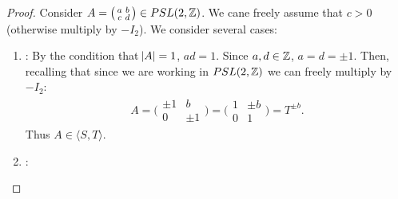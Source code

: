 \begin{proof}
Consider $A = \big(\begin{smallmatrix}
  a & b\\
  c & d
\end{smallmatrix}\big) \in PSL(2,\mathbb{Z})$. We cane freely assume that $c > 0$ (otherwise multiply by $- I_2$). We consider several cases:

\begin{enumerate}
    \item {}:
    By the condition that $\abs{A} = 1$, $ad = 1$. Since $a,d \in \mathbb{Z}$, $a = d = \pm 1$. Then, recalling that since we are working in $PSL(2,\mathbb{Z})$ we can freely multiply by $-I_2$:
    \begin{align*}
        A =  \bigg( \begin{matrix}
  \pm 1 & b\\
  0 & \pm 1
\end{matrix} \bigg) = \bigg( \begin{matrix}
  1 & \pm b\\
  0 & 1
\end{matrix} \bigg) = T^{\pm b}.
    \end{align*}
    Thus $A \in \langle S,T \rangle$.
    
    \item {}:
    

\end{enumerate}
\end{proof}
